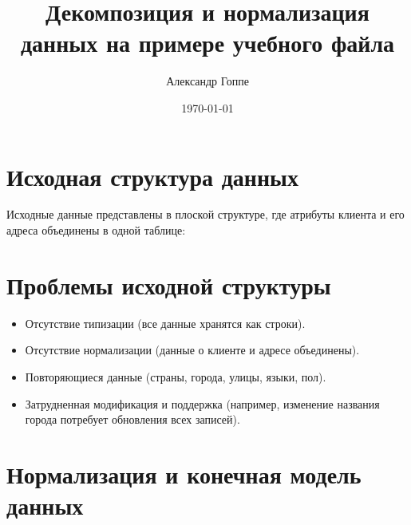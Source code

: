 \documentclass[a4paper,12pt]{article}
\title{Декомпозиция и нормализация данных на примере учебного файла}
\author{Александр Гоппе}
\date{\today}
\begin{document}
    \maketitle

    \section{Исходная структура данных}

    Исходные данные представлены в плоской структуре, где атрибуты клиента и его адреса объединены в одной таблице:

    \begin{center}
    \end{center}

    \section{Проблемы исходной структуры}

    \begin{itemize}
        \item Отсутствие типизации (все данные хранятся как строки).
        \item Отсутствие нормализации (данные о клиенте и адресе объединены).
        \item Повторяющиеся данные (страны, города, улицы, языки, пол).
        \item Затрудненная модификация и поддержка (например, изменение названия города потребует обновления всех записей).
    \end{itemize}

    \section{Нормализация и конечная модель данных}
\end{document}

